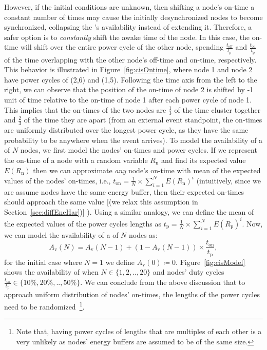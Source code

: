 However, if the initial conditions are unknown, then shifting a node's on-time a constant number of times may cause the initially desynchronized nodes to become synchronized, collapsing the \cis's availability instead of extending it. Therefore, a safer option is to \emph{constantly} shift the awake time of the node. In this case, the on-time will shift over the entire power cycle of the other node, spending $\frac{ t_\text{off} }{t_\text{p}}$ and $\frac{ t_\text{on} }{t_\text{p}}$ of the time overlapping with the other node's off-time and on-time, respectively. This behavior is illustrated in Figure~\ref{fig:cisOntime}, where node 1 and node 2 have power cycles of (2,6) and (1,5). Following the time axis from the left to the right, we can observe that the position of the on-time of node 2 is shifted by -1 unit of time relative to the on-time of node 1 after each power cycle of node 1. This implies that the on-times of the two nodes are $\frac{1}{3}$ of the time cluster together and $\frac{2}{3}$ of the time they are apart (from an external event standpoint, the on-times are uniformly distributed over the longest power cycle, as they have the same probability to be anywhere when the event arrives). To model the availability of a \cis of $N$ nodes, we first model the nodes' on-times and power cycles.
%
If we represent the on-time of a node with a random variable $R_\text{n}$ and find its expected value $E(R_\text{n})$ then we can approximate \emph{any} \cis node's on-time with mean of the expected values of the nodes' on-times, i.e., $t_\text{on} = \frac{1}{N} \times \sum_{i=1}^{N} E(R_\text{n})^i$ (intuitively, since we are assume \cis nodes have the same energy buffer, then their expected on-times should approach the same value [(we relax this assumption in Section~\ref{sec:diffEneHar})] ). Using a similar analogy, we can define the mean of the expected values of the power cycles lengths as $t_\text{p} = \frac{1}{N} \times \sum_{i=1}^{N} E(R_\text{p})^i$. Now, we can model the availability of a \cis of $N$ nodes as:
%
%	
\begin{equation}
	A_\text{v}(N) = A_\text{v}(N-1) + \left(1-A_\text{v}(N-1)\right) \times \frac{t_\text{on}}{t_\text{p}},
		\label{eq:cisModel}
\end{equation}
%
for the initial case where $N=1$ we define $A_\text{v}(0)\coloneqq 0$. Figure~\ref{fig:cisModel} shows the availability of \cis when $N\in\{1,2,..,20\}$ and nodes' duty cycles $\frac{t_\text{on}}{t_\text{p}}\in\{10\%,20\%,..,50\%\}$.
%
We can conclude from the above discussion that to approach uniform distribution of nodes' on-times, the lengths of the power cycles need to be randomized~\footnote{Note that, having power cycles of lengths that are multiples of each other is a very unlikely as nodes' energy buffers are assumed to be of the same size.}. 

